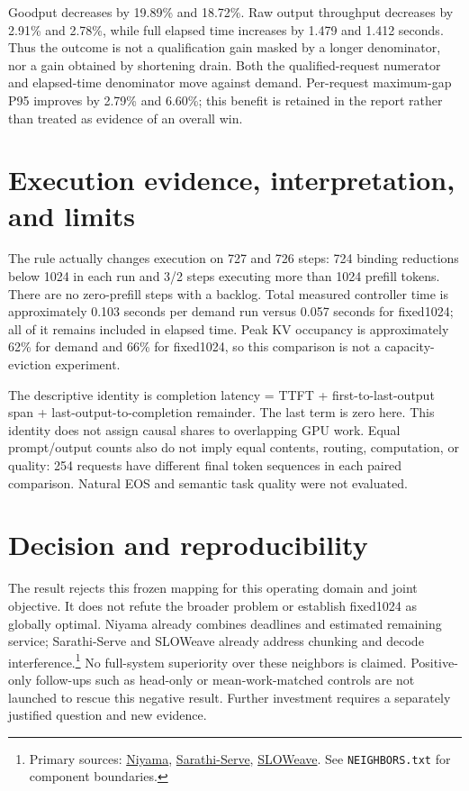 \documentclass[10pt,a4paper]{article}
\begin{document}
Goodput decreases by 19.89\% and 18.72\%. Raw output throughput decreases by
2.91\% and 2.78\%, while full elapsed time increases by 1.479 and 1.412 seconds.
Thus the outcome is not a qualification gain masked by a longer denominator, nor
a gain obtained by shortening drain. Both the qualified-request numerator and
elapsed-time denominator move against demand. Per-request maximum-gap P95 improves
by 2.79\% and 6.60\%; this benefit is retained in the report rather than treated
as evidence of an overall win.

\section*{Execution evidence, interpretation, and limits}
The rule actually changes execution on 727 and 726 steps: 724 binding reductions
below 1024 in each run and 3/2 steps executing more than 1024 prefill tokens.
There are no zero-prefill steps with a backlog. Total measured controller time is
approximately 0.103 seconds per demand run versus 0.057 seconds for fixed1024;
all of it remains included in elapsed time. Peak KV occupancy is approximately
62\% for demand and 66\% for fixed1024, so this comparison is not a capacity-eviction
experiment.

The descriptive identity is completion latency = TTFT + first-to-last-output span
+ last-output-to-completion remainder. The last term is zero here. This identity
does not assign causal shares to overlapping GPU work. Equal prompt/output counts
also do not imply equal contents, routing, computation, or quality: 254 requests
have different final token sequences in each paired comparison. Natural EOS and
semantic task quality were not evaluated.

\clearpage
\section*{Decision and reproducibility}
The result rejects this frozen mapping for this operating domain and joint objective.
It does not refute the broader problem or establish fixed1024 as globally optimal.
Niyama already combines deadlines and estimated remaining service; Sarathi-Serve
and SLOWeave already address chunking and decode interference.\footnote{Primary sources:
\href{https://arxiv.org/html/2503.22562v1}{Niyama},
\href{https://arxiv.org/abs/2403.02310}{Sarathi-Serve},
\href{https://arxiv.org/html/2609.07883v1}{SLOWeave}.
See \texttt{NEIGHBORS.txt} for component boundaries.}
No full-system
superiority over these neighbors is claimed. Positive-only follow-ups such as
head-only or mean-work-matched controls are not launched to rescue this negative
result. Further investment requires a separately justified question and new evidence.
\end{document}
